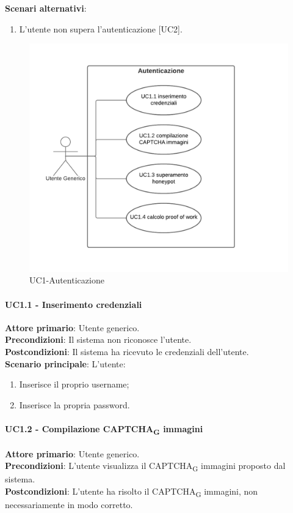 \textbf{Scenari alternativi}:
\begin{enumerate}
    \item L’utente non supera l'autenticazione [UC2].
\end{enumerate}

\begin{figure}[H]
    \centering
    \includegraphics[scale=0.8]{img/Autenticazione.png}
    \caption{UC1-Autenticazione}
\end{figure}

\paragraph{UC1.1 - Inserimento credenziali}
\textbf{Attore primario}: Utente generico.\\
\textbf{Precondizioni}: Il sistema non riconosce l'utente.\\
\textbf{Postcondizioni}: Il sistema ha ricevuto le credenziali dell'utente.\\

\textbf{Scenario principale}: L'utente:
\begin{enumerate}
   \item Inserisce il proprio username;
   \item Inserisce la propria password.
\end{enumerate}

\paragraph{UC1.2 - Compilazione CAPTCHA\textsubscript{G} immagini}
\textbf{Attore primario}: Utente generico.\\
\textbf{Precondizioni}: L'utente visualizza il CAPTCHA\textsubscript{G} immagini proposto dal sistema.\\
\textbf{Postcondizioni}: L'utente ha risolto il CAPTCHA\textsubscript{G} immagini, non necessariamente in modo corretto.\\

